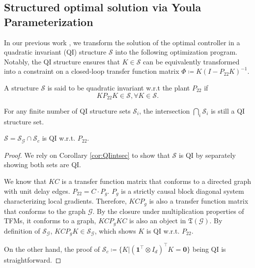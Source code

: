 \subsection{Structured optimal solution via Youla Parameterization}
In our previous work \cite{Yuanji2024disH2}, we transform the solution of the optimal controller in a quadratic invariant (QI) structure \(\mathcal{S}\) into the following optimization program. Notably, the QI structure ensures that \(K\in \mathcal{S}\) can be equivalently transformed into a constraint on a closed-loop transfer function matrix \(\Phi \coloneqq K(I- P_{22}K)^{-1}\).
\begin{defn}
A structure \(\mathcal{S}\) is said to be quadratic invariant w.r.t the plant \(P_{22}\) if
\[
K P_{22} K \in \mathcal{S}, \forall K\in \mathcal{S}.
\]
\end{defn}
\begin{cor}\label{cor:QIintsec}
For any finite number of QI structure sets \(\mathcal{S}_i\), the intersection \(\bigcap_{i} \mathcal{S}_i\) is still a QI structure set.
\end{cor}

\begin{lemma}
\(\mathcal{S} = \mathcal{S}_\mathcal{G} \cap \mathcal{S}_c\) is QI w.r.t. \(P_{22}\). 
\end{lemma}
\begin{proof}
We rely on Corollary \ref{cor:QIintsec} to show that \(\mathcal{S}\) is QI by separately showing both sets are QI.

We know that \(KC\) is a transfer function matrix that conforms to a directed graph with unit delay edges. \(P_{22} = C \cdot P_g\). \(P_g\) is a strictly causal block diagonal system characterizing local gradients. Therefore, \(K C P_g\) is also a transfer function matrix that conforms to the graph \(\mathcal{G}\). By the closure under multiplication properties of TFMs, it conforms to a graph, \(K C P_g K C\) is also an object in \(\mathfrak{T}(\mathcal{G})\). By definition of \(\mathcal{S}_\mathcal{G}\), \(K C P_g K \in \mathcal{S}_\mathcal{G}\), which shows \(K\) is QI w.r.t. \(P_{22}\).

On the other hand, the proof of \(\mathcal{S}_c \coloneqq \{K\vert(\mathbf{1}^\top \otimes I_d)^\top K = \mathbf{0}\}\) being QI is straightforward.
\end{proof}

